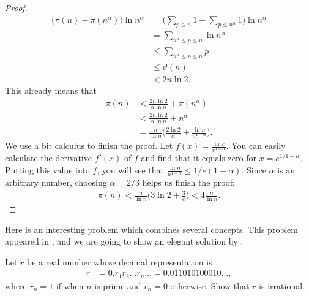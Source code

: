 \begin{proof}
\begin{align*}
				\Big(\pi(n) - \pi(n^{\alpha})\Big) \ln n^{\alpha} &= \Big(\sum_{p \leq n} 1 - \sum_{p \leq n^{
						\alpha}} 1\Big) \ln n^{\alpha}\\
														  &=\sum_{n^{\alpha} \leq p \leq n} \ln n^{\alpha}\\
														  &\leq \sum_{n^{\alpha} \leq p \leq n} p\\
														  &\leq \vartheta(n)\\
														  &< 2n \ln 2.
			\end{align*}
		This already means that
			\begin{align*}
				\pi(n) &< \frac{2n \ln 2}{\alpha \ln n} + \pi(n^{\alpha})\\
					   &< \frac{2n \ln 2}{\alpha \ln n} + n^{\alpha}\\
					   &= \frac{n}{\ln n} \Big(\frac{2 \ln 2}{\alpha} + \frac{\ln n}{n^{1-\alpha}} \Big).
			\end{align*}
		We use a bit calculus to finish the proof. Let $ f(x)=\frac{\ln x}{x^{1-\alpha}}$. You can easily calculate the derivative $f'(x)$ of $f$ and find that it equals zero for $x=e^{1/1-\alpha}$. Putting this value into $f$, you will see that $\frac{\ln n}{n^{1-\alpha}} \leq 1/e(1-\alpha)$. Since $\alpha$ is an arbitrary number, choosing $\alpha = 2/3$ helps us finish the proof:
			\begin{align*}
				\pi(n) < \frac{n}{\ln n} \Big(3 \ln 2 + \frac{3}{e} \Big)< 4 \frac{n}{\ln n}.
			\end{align*}
	\end{proof}


Here is an interesting problem which combines several concepts. This problem appeared in \textcite[Chapter $\S 9$, section $9,3$, Theorem $137$, Page $145$]{hardy_wright_1971}, and we are going to show an elegant solution by \textcite{nasehpour_2018}.
\begin{problem}\label{prob:nasehpour}
	Let $r$ be a real number whose decimal representation is
	\begin{align*}
	r & = 0.r_1r_2\ldots r_n \ldots = 0.011010100010\ldots,
	\end{align*}
	where $r_n=1$ if when $n$ is prime and $r_n=0$ otherwise. Show that $r$ is irrational.
\end{problem}

